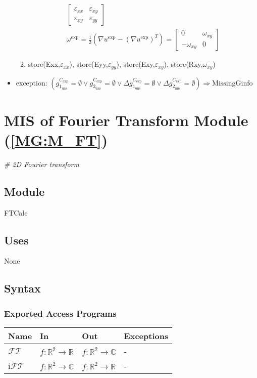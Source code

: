 \documentclass[12pt, titlepage]{article}
\begin{document}
\begin{itemize}
\begin{enumerate}
\begin{equation*}
\begin{gathered}
\begin{bmatrix}
	\varepsilon_{\mathit{xx}} & \varepsilon_{\mathit{xy}} \\
	\varepsilon_{\mathit{xy}} & \varepsilon_{\mathit{yy}}
	\end{bmatrix} \\
\omega^{\text{exp}} = \frac{1}{2}(\nabla u^{\text{exp}}-(\nabla 
u^{\text{exp}})^{T})= \begin{bmatrix}
	0 & \omega_{\mathit{xy}} \\
	-\omega_{\mathit{xy}} & 0
	\end{bmatrix}
\end{gathered}
\end{equation*}
\item store(Exx,$\varepsilon_{\mathit{xx}}$), 
store(Eyy,$\varepsilon_{\mathit{yy}}$), store(Exy,$\varepsilon_{\mathit{xy}}$), 
store(Rxy,$\omega_{\mathit{xy}}$) 
\end{enumerate}  
\item exception:\newline
$(g_{1_{{\text{uns}}}}^{C_{\text{exp}}}=\emptyset \vee 
g_{2_{{\text{uns}}}}^{C_{\text{exp}}}=\emptyset \vee \Delta 
g_{1_{{\text{uns}}}}^{C_{\text{exp}}}=\emptyset \vee \Delta 
g_{2_{{\text{uns}}}}^{C_{\text{exp}}}=\emptyset) \Rightarrow 
\text{MissingGinfo}$
\end{itemize}

\section{MIS of Fourier Transform Module (\texorpdfstring{\cref{MG:M_FT}}))} 
\label{MIS_FT}
\textit{{\#} 2D Fourier transform}
\subsection{Module}
FTCalc
\subsection{Uses}
None
\subsection{Syntax}

\subsubsection{Exported Access Programs}

\begin{center}
\begin{tabular}{p{2cm} p{4cm} p{4cm} p{3cm}}
\hline
\textbf{Name} & \textbf{In} & \textbf{Out} & \textbf{Exceptions} \\
\hline
$\mathcal{FT}$ & $f:\mathbb{R}^2\rightarrow\mathbb{R}$ & 
$f:\mathbb{R}^2\rightarrow\mathbb{C}$ & - \\
i$\mathcal{FT}$ & $f:\mathbb{R}^2\rightarrow\mathbb{C}$ & 
$f:\mathbb{R}^2\rightarrow\mathbb{R}$ & - \\
\hline
\end{tabular}
\end{center}
\end{document}

